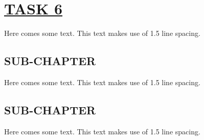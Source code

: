 \documentclass[fontsize=11pt]{scrartcl}
\begin{document}
\section{\uline{TASK 6}}
Here comes some text. This text makes use of 1.5 line spacing. 
\subsection{SUB-CHAPTER}
Here comes some text. This text makes use of 1.5 line spacing. 
\subsection{SUB-CHAPTER}
Here comes some text. This text makes use of 1.5 line spacing. 
\end{document}
